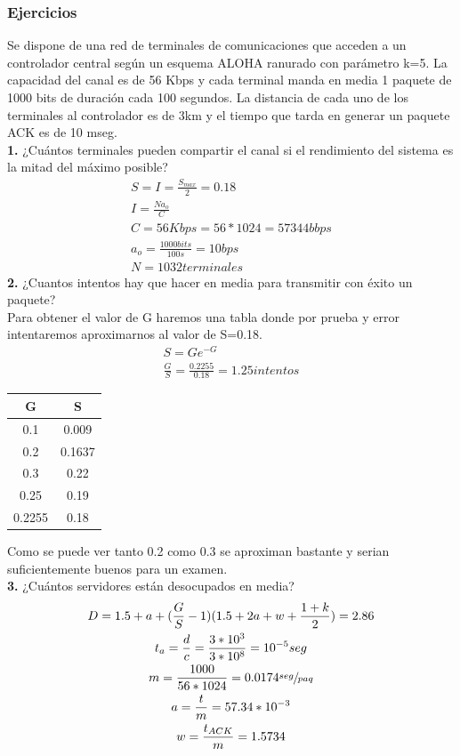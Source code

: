 \subsubsection{Ejercicios}
\begin{exercise}[4]
Se dispone de una red de terminales de comunicaciones que acceden a un controlador central según un esquema ALOHA ranurado con parámetro k=5. La capacidad del canal es de 56 Kbps y cada terminal manda en media 1 paquete de 1000 bits de duración cada 100 segundos. La distancia de cada uno de los terminales al controlador es de 3km y el tiempo que tarda en generar un paquete ACK es de 10 mseg.\\
\textbf{1.} ¿Cuántos terminales pueden compartir el canal si el rendimiento del sistema es la mitad del máximo posible?\\
\begin{gather*}
S=I=\frac{S_{max}}{2}=0.18\\
I=\frac{Na_o}{C}\\
C=56Kbps=56*1024=57344bbps\\
a_o=\frac{1000bits}{100s}=10bps\\
N=1032terminales
\end{gather*}
\textbf{2.} ¿Cuantos intentos hay que hacer en media para transmitir con éxito un paquete?\\
Para obtener el valor de G haremos una tabla donde por prueba y error intentaremos aproximarnos al valor de S=0.18.
\begin{gather*}
S=Ge^{-G}\\
\frac{G}{S}=\frac{0.2255}{0.18}=1.25 intentos
\end{gather*}
\begin{center}
\begin{tabular}{c | c}
G & S \\\hline
0.1 & 0.009\\
0.2 & 0.1637\\
0.3 & 0.22\\
0.25 & 0.19\\
0.2255 & 0.18\\
\end{tabular}
\end{center}
Como se puede ver tanto 0.2 como 0.3 se aproximan bastante y serian suficientemente buenos para un examen.\\
\textbf{3.} ¿Cuántos servidores están desocupados en media?\\
\begin{gather*}
D=1.5+a+(\frac{G}{S}-1)(1.5+2a+w+\frac{1+k}{2})=2.86\\
t_a=\frac{d}{c}=\frac{3*10^3}{3*10^8}=10^{-5}seg\\
m=\frac{1000}{56*1024}=0.0174\sfrac{seg}{paq}\\
a=\frac{t}{m}=57.34*10^{-3}\\
w=\frac{t_{ACK}}{m}=1.5734
\end{gather*}
\end{exercise}
